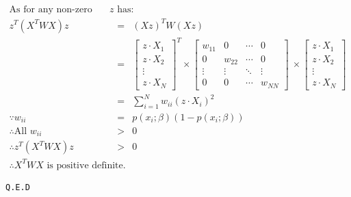 \documentclass[a4paper]{article}
\begin{document}
\begin{enumerate}
\begin{eqnarray*}
	\text{As for any non-zero vector } z \text{ has:}\\ 
	z^T (X^T W X) z &=& (X z)^T W (X z)\\
	&=& \left[ \begin{array}{c} z \cdot X_1  \\ z \cdot X_2 \\ \vdots \\z \cdot X_N \end{array} \right]^T  \times \begin{bmatrix} w_{11} & 0 & \cdots & 0 \\ 0 & w_{22}  & \cdots & 0\\ \vdots & \vdots & \ddots & \vdots \\ 0 & 0 & \cdots & w_{NN} \end{bmatrix}\ \times \left[ \begin{array}{c} z \cdot X_1  \\ z \cdot X_2 \\ \vdots \\z \cdot X_N \end{array} \right] \\
	&=& \sum_{i=1}^Nw_{ii}(z \cdot X_i)^2 \\
	\because w_{ii} &=& p(x_i;\beta)(1-p(x_i;\beta)) \\
	\therefore \text{All } w_{ii} &>& 0\\
	\therefore z^T (X^T W X) z &>& 0\\
	\therefore X^T W X  \text{ is positive definite.}
\end{eqnarray*}

\texttt{Q.E.D}

\end{enumerate}
\end{document}
